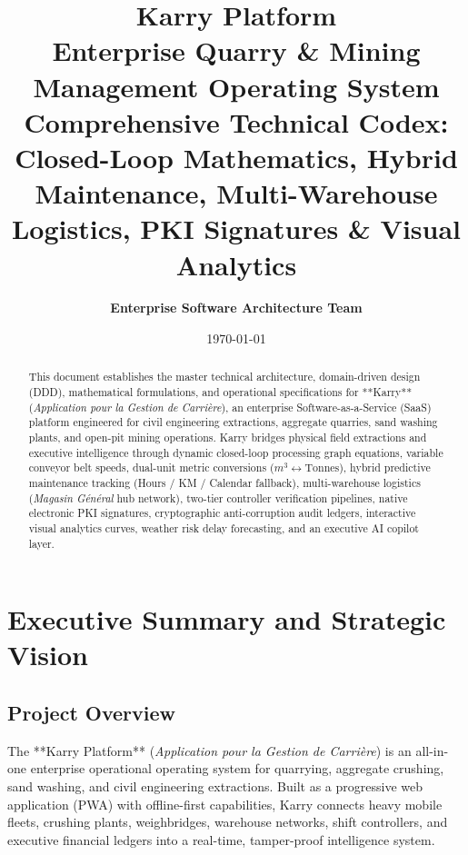 \documentclass[11pt, a4paper]{article}
\title{%
  \vspace{-1cm}
  \Huge \textbf{\color{primarynavy}Karry Platform} \\
  \Large \textbf{Enterprise Quarry \& Mining Management Operating System} \\
  \vspace{0.3cm}
  \large Comprehensive Technical Codex: Closed-Loop Mathematics, Hybrid Maintenance, Multi-Warehouse Logistics, PKI Signatures \& Visual Analytics
}
\author{\textbf{Enterprise Software Architecture Team}}
\date{\today}
\begin{document}
\maketitle
\thispagestyle{empty}

\begin{abstract}
\noindent
This document establishes the master technical architecture, domain-driven design (DDD), mathematical formulations, and operational specifications for **Karry** (\textit{Application pour la Gestion de Carri\`ere}), an enterprise Software-as-a-Service (SaaS) platform engineered for civil engineering extractions, aggregate quarries, sand washing plants, and open-pit mining operations. Karry bridges physical field extractions and executive intelligence through dynamic closed-loop processing graph equations, variable conveyor belt speeds, dual-unit metric conversions ($m^3 \leftrightarrow \text{Tonnes}$), hybrid predictive maintenance tracking (Hours / KM / Calendar fallback), multi-warehouse logistics (\textit{Magasin G\'en\'eral} hub network), two-tier controller verification pipelines, native electronic PKI signatures, cryptographic anti-corruption audit ledgers, interactive visual analytics curves, weather risk delay forecasting, and an executive AI copilot layer.
\end{abstract}

\tableofcontents
\newpage

\section{Executive Summary and Strategic Vision}

\subsection{Project Overview}
The **Karry Platform** (\textit{Application pour la Gestion de Carri\`ere}) is an all-in-one enterprise operational operating system for quarrying, aggregate crushing, sand washing, and civil engineering extractions. Built as a progressive web application (PWA) with offline-first capabilities, Karry connects heavy mobile fleets, crushing plants, weighbridges, warehouse networks, shift controllers, and executive financial ledgers into a real-time, tamper-proof intelligence system.
\end{document}
